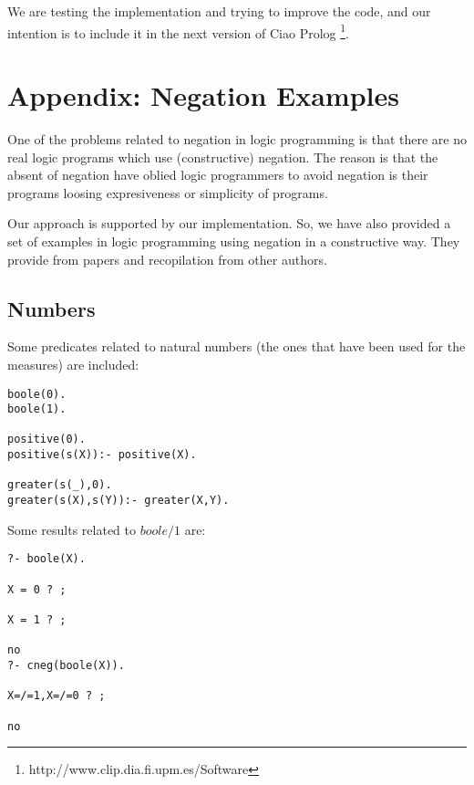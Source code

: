 \documentclass{tlp}
\begin{document}
We are testing the implementation and trying to improve the code, and
our intention is to include it in the next version of Ciao Prolog
\footnote{http://www.clip.dia.fi.upm.es/Software}.
  





\newpage

\appendix

\section*{Appendix: Negation Examples}

One of the problems related to negation in logic programming is that there are
no real logic programs which use (constructive) negation. The reason is that
the absent of negation have oblied logic programmers to avoid negation is
their programs loosing expresiveness or simplicity of programs.

Our approach is supported by our implementation. So, we have also provided a
set of examples in logic programming using negation in a constructive
way. They provide from papers and recopilation from other authors.

\subsection*{Numbers}

Some predicates related to natural numbers (the ones that have been used for
the measures) are included:
\begin{small}
\begin{verbatim}
boole(0).
boole(1).

positive(0).
positive(s(X)):- positive(X).

greater(s(_),0).
greater(s(X),s(Y)):- greater(X,Y).
\end{verbatim}
\end{small}

Some results related to $boole/1$ are:
\begin{small}
\begin{verbatim}
?- boole(X).

X = 0 ? ;

X = 1 ? ;

no
?- cneg(boole(X)).

X=/=1,X=/=0 ? ;

no
\end{verbatim}
\end{small}
\end{document}
